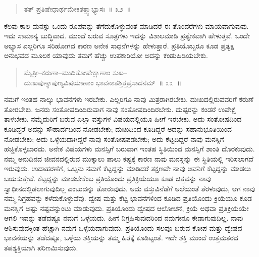 \vspace{-0.3cm}

\begin{verse}
ತತ್​ ಪ್ರತಿಷೇಧಾರ್ಥಮೇಕತತ್ತ್ವಾಭ್ಯಾಸಃ~॥ ೩೨~॥
\end{verse}

\vspace{-0.3cm}


\eject

ಕೆಲವು ಕಾಲ ಮನಸ್ಸು ಒಂದು ರೂಪವನ್ನು ತೆಗೆದುಕೊಳ್ಳುವಂತೆ ಮಾಡಿದರೆ ಈ ತೊಂದರೆಗಳು ಮಾಯವಾಗುವುವು. ಇದು ಸಾಮಾನ್ಯ ಬುದ್ಧಿವಾದ. ಮುಂದೆ ಬರುವ ಸೂತ್ರಗಳು ಇದನ್ನು ವಿಶಾಲಮಾಡಿ ಪ್ರತ್ಯೇಕವಾಗಿ ಹೇಳುತ್ತವೆ. ಒಂದೇ ಅಭ್ಯಾಸ ಎಲ್ಲರಿಗೂ ಸರಿಹೋಗದ ಕಾರಣ ಅನೇಕ ಸಾಧನೆಗಳನ್ನು ಹೇಳುತ್ತಾರೆ. ಪ್ರತಿಯೊಬ್ಬರೂ ಕೂಡ ಪ್ರತ್ಯಕ್ಷ ಅನುಭವದ ಮೂಲಕ ಯಾವುದು ತಮಗೆ ಹೆಚ್ಚು ಉಪಕಾರಿಯೋ ಅದನ್ನು ಕಂಡುಹಿಡಿಯಬೇಕು. 

\vspace{-0.3cm}

\begin{verse}
ಮೈತ್ರೀ–ಕರುಣಾ–ಮುದಿತೋಪೇಕ್ಷಾಣಾಂ ಸುಖ–\\ದುಃಖಪುಣ್ಯಾಪುಣ್ಯವಿಷಯಾಣಾಂ ಭಾವನಾತಶ್ತಿತ್ತಪ್ರಸಾದನಮ್​~॥ ೩೩~॥
\end{verse}

\vspace{-0.3cm}


\vskip 0.2cm

ನಮಗೆ ಇಂತಹ ನಾಲ್ಕು ಭಾವನೆಗಳು ಇರಬೇಕು. ಎಲ್ಲರಿಗೂ ನಾವು ಮಿತ್ರರಾಗಿರಬೇಕು. ದುಃಖದಲ್ಲಿರುವವರಿಗೆ ಕರುಣೆ ತೋರಬೇಕು. ಜನರು ಸಂತೋಷದಿಂದಿರುವಾಗ ನಾವು ಸಂತೋಷದಿಂದಿರಬೇಕು. ದುಷ್ಟರನ್ನು ಕಂಡರೆ ಉಪೇಕ್ಷೆ ತಾಳಬೇಕು. ನಮ್ಮೆದುರಿಗೆ ಬರುವ ಎಲ್ಲಾ ವಸ್ತುಗಳ ವಿಷಯದಲ್ಲಿಯೂ ಹೀಗೆ ಇರಬೇಕು. ಅದು ಸಂತೋಷದಿಂದ ಕೂಡಿದ್ದರೆ ಅದನ್ನು ಸೌಹಾರ್ದದಿಂದ ನೋಡಬೇಕು; ದುಃಖದಿಂದ ಕೂಡಿದ್ದರೆ ಅದನ್ನು ಸಹಾನುಭೂತಿಯಿಂದ ನೋಡಬೇಕು; ಅದು ಒಳ್ಳೆಯದಾಗಿದ್ದರೆ ನಾವು ಸಂತೋಷಪಡಬೇಕು; ಅದು ಕೆಟ್ಟದಿದ್ದರೆ ನಾವು ಮನಸ್ಸಿಗೆ ಹಚ್ಚಿಕೊಳ್ಳಬಾರದು. ಅನೇಕ ವಿಷಯಗಳು ಮನಸ್ಸಿಗೆ ಬರುವಾಗ ಇಂತಹ ಸ್ಥಿತಿಯಿಂದ ಮನಸ್ಸಿಗೆ ಶಾಂತಿ ದೊರಕುವುದು. ನಮ್ಮ ಅನುದಿನದ ಜೀವನದಲ್ಲಿರುವ ಮುಕ್ಕಾಲು ಪಾಲು ಕಷ್ಟಕ್ಕೆ ಕಾರಣ ನಾವು ಮನಸ್ಸನ್ನು ಈ ಸ್ಥಿತಿಯಲ್ಲಿ ಇರಿಸಲಾಗದೆ ಇರುವುದು. ಉದಾಹರಣೆಗೆ, ಒಬ್ಬನು ನಮಗೆ ಕೆಟ್ಟದ್ದನ್ನು ಮಾಡಿದರೆ ತಕ್ಷಣವೇ ನಾವು ಅವನಿಗೆ ಕೆಟ್ಟದ್ದನ್ನು ಮಾಡಲು ಬಯಸುತ್ತೇವೆ. ಕೆಟ್ಟದ್ದನ್ನು ಮಾಡಬೇಕೆಂಬ ಪ್ರತಿಯೊಂದು ಪ್ರತಿಕ್ರಿಯೆಯೂ ಕೂಡ ಚಿತ್ತವನ್ನು ನಾವು ಸ್ವಾಧೀನದಲ್ಲಿಡಲಾಗುವುದಿಲ್ಲ ಎಂಬುದನ್ನು ತೋರುವುದು. ಅದು ವಸ್ತುವಿನೆಡೆಗೆ ಅಲೆಯಂತೆ ತೆರಳುವುದು, ಆಗ ನಾವು ನಮ್ಮ ನಿಗ್ರಹವನ್ನು ಕಳೆದುಕೊಳ್ಳುವೆವು. ದ್ವೇಷ ಮತ್ತು ಕೆಟ್ಟ ಭಾವನೆಗಳಿಂದ ಕೂಡಿದ ಪ್ರತಿಯೊಂದು ಕ್ರಿಯೆಯೂ ಕೂಡ ಮನಸ್ಸಿಗೆ ಅಷ್ಟು ನಷ್ಟವನ್ನುಂಟು ಮಾಡುವುದು. ಪ್ರತಿಯೊಂದು ದ್ವೇಷದ ಆಲೋಚನೆ, ಕ್ರಿಯೆ ಅಥವಾ ಪ್ರತಿಕ್ರಿಯೆಯೇ ಆಗಲಿ ಇವನ್ನು ತಡೆದಷ್ಟೂ ನಮಗೆ ಒಳ್ಳೆಯದು. ಹೀಗೆ ನಿಗ್ರಹಿಸುವುದರಿಂದ ನಮಗೇನೂ ಕೇಡಾಗುವುದಿಲ್ಲ. ನಾವು ಆಶಿಸುವುದಕ್ಕಿಂತ ಹೆಚ್ಚಾಗಿ ನಮಗೆ ಒಳ್ಳೆಯದಾಗುವುದು. ಪ್ರತಿಯೊಂದು ಸಲವೂ ಬರುವ ಕೋಪ ಮತ್ತು ದ್ವೇಷದ ಭಾವನೆಯನ್ನು ತಡೆದಷ್ಟೂ, ಒಳ್ಳೆಯ ಶಕ್ತಿಯನ್ನು ತಮ್ಮ ಹಿತಕ್ಕೆ ಕೂಡಿಟ್ಟಂತೆ. ಇದೇ ಶಕ್ತಿ ಮುಂದೆ ಉತ್ತಮತರದ ತಪಶ್ಯಕ್ತಿಯಾಗಿ ಪರಿಣಮಿಸುವುದು. 


